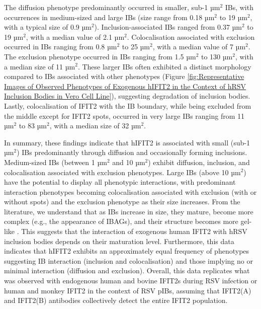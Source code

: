 The diffusion phenotype predominantly occurred in smaller, sub-1 \(\mbox{µm}^2\) IBs, with occurrences in medium-sized and large IBs (size range from 0.18 \(\mbox{µm}^2\) to 19 \(\mbox{µm}^2\), with a typical size of 0.9 \(\mbox{µm}^2\)). Inclusion-associated IBs ranged from 0.37 \(\mbox{µm}^2\) to 19 \(\mbox{µm}^2\), with a median value of 2.1 \(\mbox{µm}^2\). Colocalisation associated with exclusion occurred in IBs ranging from 0.8 \(\mbox{µm}^2\) to 25 \(\mbox{µm}^2\), with a median value of 7 \(\mbox{µm}^2\). The exclusion phenotype occurred in IBs ranging from 1.5 \(\mbox{µm}^2\) to 130 \(\mbox{µm}^2\), with a median size of 11 \(\mbox{µm}^2\). These larger IBs often exhibited a distinct morphology compared to IBs associated with other phenotypes (Figure \ref{fig:Representative Images of Observed Phenotypes of Exogenous hIFIT2 in the Context of hRSV Inclusion Bodies in Vero Cell Line}), suggesting degradation of inclusion bodies. Lastly, colocalisation of IFIT2 with the IB boundary, while being excluded from the middle except for IFIT2 spots, occurred in very large IBs ranging from 11 \(\mbox{µm}^2\) to 83 \(\mbox{µm}^2\), with a median size of 32 \(\mbox{µm}^2\).

In summary, these findings indicate that hIFIT2 is associated with small (sub-1 \(\mbox{µm}^2\)) IBs predominantly through diffusion and occasionally forming inclusions. Medium-sized IBs (between 1 \(\mbox{µm}^2\) and 10 \(\mbox{µm}^2\)) exhibit diffusion, inclusion, and colocalisation associated with exclusion phenotypes. Large IBs (above 10 \(\mbox{µm}^2\)) have the potential to display all phenotypic interactions, with predominant interaction phenotypes becoming colocalisation associated with exclusion (with or without spots) and the exclusion phenotype as their size increases. From the literature, we understand that as IBs increase in size, they mature, become more complex (e.g., the appearance of IBAGs), and their structure becomes more gel-like \cite{Weber1995NonstructuralSerum, Fricke2013P38Assembly, Rincheval2017FunctionalVirus, Jobe2021BovineResponses}. This suggests that the interaction of exogenous human IFIT2 with hRSV inclusion bodies depends on their maturation level. Furthermore, this data indicates that hIFIT2 exhibits an approximately equal frequency of phenotypes suggesting IB interaction (inclusion and colocalisation) and those implying no or minimal interaction (diffusion and exclusion). Overall, this data replicates what was observed with endogenous human and bovine IFIT2s during RSV infection or human and monkey IFIT2 in the context of RSV pIBs, assuming that IFIT2(A) and IFIT2(B) antibodies collectively detect the entire IFIT2 population.

